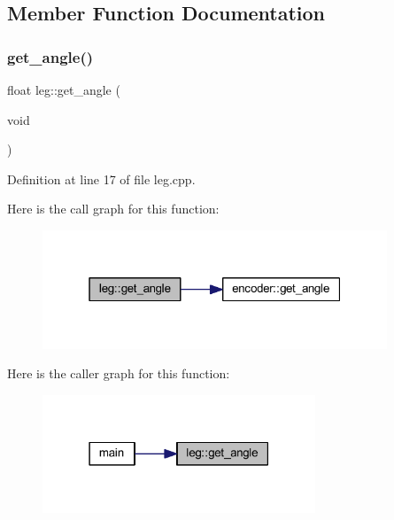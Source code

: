 \subsection{Member Function Documentation}
\mbox{\label{classleg_a0f98905721d2f20536b7dc908597263e}} 
\subsubsection{\texorpdfstring{get\_angle()}{get\_angle()}}
{\footnotesize\ttfamily float leg\+::get\+\_\+angle (\begin{DoxyParamCaption}\item[{void}]{ }\end{DoxyParamCaption})}



Definition at line 17 of file leg.\+cpp.

Here is the call graph for this function\+:
\nopagebreak
\begin{figure}[H]
\begin{center}
\leavevmode
\includegraphics[width=292pt]{classleg_a0f98905721d2f20536b7dc908597263e_cgraph}
\end{center}
\end{figure}
Here is the caller graph for this function\+:
\nopagebreak
\begin{figure}[H]
\begin{center}
\leavevmode
\includegraphics[width=231pt]{classleg_a0f98905721d2f20536b7dc908597263e_icgraph}
\end{center}
\end{figure}
\mbox{\label{classleg_ab7d470db701c7745266338157b79e1d0}} 
